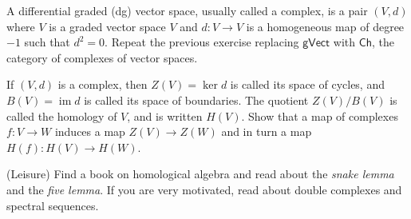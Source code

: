 \begin{question} A differential graded (dg) vector space,
usually called a complex, is a pair $(V,d)$ where $V$ is 
a graded vector space $V$ and $d: V \to V$ is a homogeneous
map of degree $-1$ such that $d^2 = 0$. Repeat the previous
exercise replacing $\mathsf{gVect}$ with $\mathsf{Ch}$,
the category of complexes of vector spaces.
\end{question}

\begin{question} If $(V,d)$ is a complex, then $Z(V) = \ker d$ 
is called its space of cycles, and $B(V) = \operatorname{im} d$ 
is called its space of boundaries. The quotient $Z(V) / B(V)$ is called
the homology of $V$, and is written $H(V)$. Show that a map 
of complexes $f : V \to W$ induces a map $Z(V) \to Z(W)$ and 
in turn a map $H(f) : H(V) \to H(W)$. 
\end{question}
 
\begin{question} (Leisure) Find a book on homological algebra
and read about the \emph{snake lemma} and the \emph{five lemma}.
If you are very motivated, read about double complexes and spectral
sequences.
\end{question}